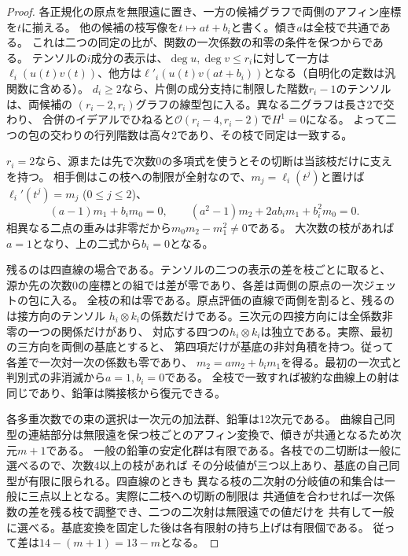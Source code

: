 \begin{proof}
各正規化の原点を無限遠に置き、一方の候補グラフで両側のアフィン座標を$t$に揃える。
他の候補の枝写像を$t\mapsto at+b_i$と書く。傾き$a$は全枝で共通である。
これは二つの同定の比が、関数の一次係数の和零の条件を保つからである。
テンソルの$i$成分の表示は、$\deg u,\deg v\le r_i$に対して一方は
$\ell_i(u(t)v(t))$、他方は$\ell'_i(u(t)v(at+b_i))$となる（自明化の定数は汎関数に含める）。
$d_i\ge2$なら、片側の成分支持に制限した階数$r_i-1$のテンソルは、両候補の
$(r_i-2,r_i)$グラフの線型包に入る。異なる二グラフは長さ2で交わり、
合併のイデアルでひねると$\mathcal O(r_i-4,r_i-2)$で$H^1=0$になる。
よって二つの包の交わりの行列階数は高々2であり、その枝で同定は一致する。

$r_i=2$なら、源または先で次数0の多項式を使うとその切断は当該枝だけに支えを持つ。
相手側はこの枝への制限が全射なので、$m_j=\ell_i(t^j)$と置けば
$\ell_i'(t^j)=m_j$ ($0\le j\le2$)、
\[
 (a-1)m_1+b_i m_0=0,\qquad
 (a^2-1)m_2+2ab_i m_1+b_i^2 m_0=0.
\]
相異なる二点の重みは非零だから$m_0m_2-m_1^2\ne0$である。
大次数の枝があれば$a=1$となり、上の二式から$b_i=0$となる。

残るのは四直線の場合である。テンソルの二つの表示の差を枝ごとに取ると、
源か先の次数0の座標との組では差が零であり、各差は両側の原点の一次ジェットの包に入る。
全枝の和は零である。原点評価の直線で両側を割ると、残るのは接方向のテンソル
$h_i\otimes k_i$の係数だけである。三次元の四接方向には全係数非零の一つの関係だけがあり、
対応する四つの$h_i\otimes k_i$は独立である。実際、最初の三方向を両側の基底とすると、
第四項だけが基底の非対角積を持つ。従って各差で一次対一次の係数も零であり、
$m_2=a m_2+b_i m_1$を得る。最初の一次式と判別式の非消滅から$a=1,b_i=0$である。
全枝で一致すれば被約な曲線上の射は同じであり、鉛筆は隣接核から復元できる。

各多重次数での束の選択は一次元の加法群、鉛筆は12次元である。
曲線自己同型の連結部分は無限遠を保つ枝ごとのアフィン変換で、傾きが共通となるため次元$m+1$である。
一般の鉛筆の安定化群は有限である。各枝での二切断は一般に選べるので、次数4以上の枝があれば
その分岐値が三つ以上あり、基底の自己同型が有限に限られる。四直線のときも
異なる枝の二次射の分岐値の和集合は一般に三点以上となる。実際に二枝への切断の制限は
共通値を合わせれば一次係数の差を残る枝で調整でき、二つの二次射は無限遠での値だけを
共有して一般に選べる。基底変換を固定した後は各有限射の持ち上げは有限個である。
従って差は$14-(m+1)=13-m$となる。
\end{proof}


